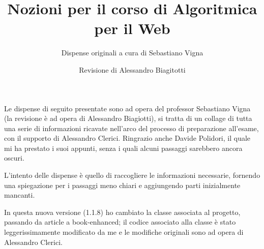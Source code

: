 \documentclass[a4paper]{book-enhanced}
\title{Nozioni per il corso di Algoritmica per il Web}
\subtitle{Dispense originali a cura di Sebastiano Vigna}
\author{Revisione di Alessandro Biagitotti}
\begin{document}
\maketitle
\noindent Le dispense di seguito presentate sono ad opera del professor Sebastiano Vigna (la
revisione è ad opera di Alessandro Biagiotti), si tratta di un collage di tutta una serie di
informazioni ricavate nell'arco del processo di preparazione all'esame, con il supporto di
Alessandro Clerici. Ringrazio anche Davide Polidori, il quale mi ha prestato i suoi appunti, senza i
quali alcuni passaggi sarebbero ancora oscuri.

L'intento delle dispense è quello di raccogliere le informazioni necessarie, fornendo una spiegazione per i passaggi meno chiari e aggiungendo parti inizialmente mancanti.

In questa nuova versione (1.1.8) ho cambiato la classe associata al progetto, passando da article a book-enhanced; il codice associato alla classe è stato leggerissimamente modificato da me e le modifiche originali sono ad opera di Alessandro Clerici.

\tableofcontents
\clearpage



\end{document}
